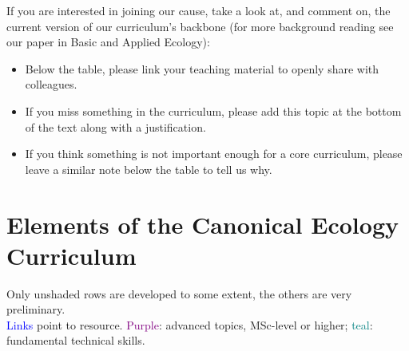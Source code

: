 \documentclass[english,11pt,a4paper, landscape]{article}
\begin{document}
If you are interested in joining our cause, take a look at, and comment on, the current version of our curriculum’s backbone (for more background reading see our paper in Basic and Applied Ecology):

\begin{itemize}
	\item Below the table, please link your teaching material to openly share with colleagues.
	\item If you miss something in the curriculum, please add this topic at the bottom of the text along with a justification.
	\item If you think something is not important enough for a core curriculum, please leave a similar note below the table to tell us why.
\end{itemize}

\section{Elements of the Canonical Ecology Curriculum}
Only unshaded rows are developed to some extent, the others are very preliminary.\\ \textcolor{blue}{Links} point to resource.
\textcolor{purple}{Purple}: advanced topics, MSc-level or higher; \textcolor{teal}{teal}: fundamental technical skills.
\end{document}
